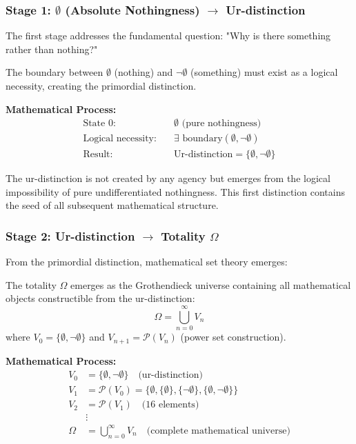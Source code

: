 \subsubsection{Stage 1: $\emptyset$ (Absolute Nothingness) $\rightarrow$ Ur-distinction}

The first stage addresses the fundamental question: "Why is there something rather than nothing?"

\begin{axiom}
The boundary between $\emptyset$ (nothing) and $\neg\emptyset$ (something) must exist as a logical necessity, creating the primordial distinction.
\end{axiom}

\textbf{Mathematical Process:}
\begin{align}
\text{State 0:} &\quad \emptyset \text{ (pure nothingness)}\\
\text{Logical necessity:} &\quad \exists \text{ boundary}(\emptyset, \neg\emptyset)\\
\text{Result:} &\quad \text{Ur-distinction} = \{\emptyset, \neg\emptyset\}
\end{align}

The ur-distinction is not created by any agency but emerges from the logical impossibility of pure undifferentiated nothingness. This first distinction contains the seed of all subsequent mathematical structure.

\subsubsection{Stage 2: Ur-distinction $\rightarrow$ Totality $\Omega$}

From the primordial distinction, mathematical set theory emerges:

\begin{definition}
The totality $\Omega$ emerges as the Grothendieck universe containing all mathematical objects constructible from the ur-distinction:
\begin{equation}
\Omega = \bigcup_{n=0}^{\infty} V_n
\end{equation}
where $V_0 = \{\emptyset, \neg\emptyset\}$ and $V_{n+1} = \mathcal{P}(V_n)$ (power set construction).
\end{definition}

\textbf{Mathematical Process:}
\begin{align}
V_0 &= \{\emptyset, \neg\emptyset\} \quad \text{(ur-distinction)}\\
V_1 &= \mathcal{P}(V_0) = \{\emptyset, \{\emptyset\}, \{\neg\emptyset\}, \{\emptyset, \neg\emptyset\}\}\\
V_2 &= \mathcal{P}(V_1) \quad \text{(16 elements)}\\
&\vdots\\
\Omega &= \bigcup_{n=0}^{\infty} V_n \quad \text{(complete mathematical universe)}
\end{align}

